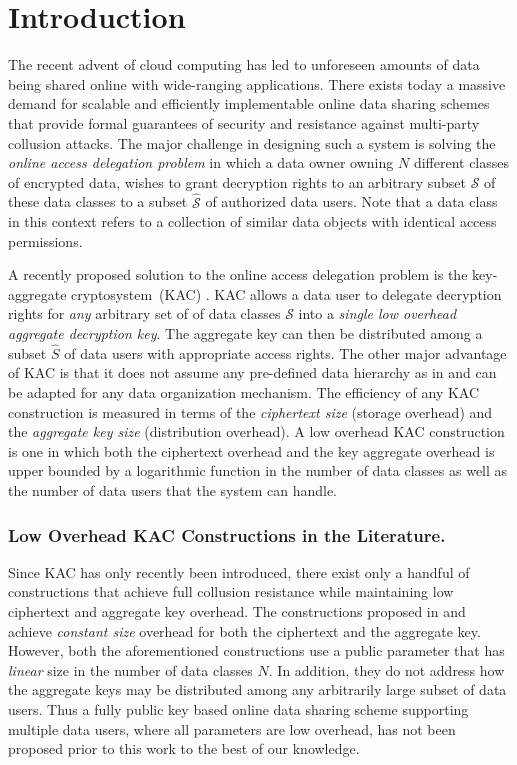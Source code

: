 \section{Introduction}
\label{sec:Introduction}

The recent advent of cloud computing has led to unforeseen amounts of data being shared online with wide-ranging applications. There exists today a massive demand for scalable and efficiently implementable online data sharing schemes that provide formal guarantees of security and resistance against multi-party collusion attacks. The major challenge in designing such a system is solving the \emph{online access delegation problem} \cite{drago2012inside,chu2014key} in which a data owner owning $N$ different classes of encrypted data, wishes to grant decryption rights to an arbitrary subset $\mathcal{S}$ of these data classes to a subset $\hat{\mathcal{S}}$ of authorized data users. Note that a data class in this context refers to a collection of similar data objects with identical access permissions.

A recently proposed solution to the online access delegation problem is the key-aggregate cryptosystem~(KAC) \cite{chu2014key,patranabis2015dynamic}. KAC allows a data user to delegate decryption rights for \emph{any} arbitrary set of of data classes $\mathcal{S}$ into a \emph{single low overhead aggregate decryption key}. The aggregate key can then be distributed among a subset $\hat{S}$ of data users with appropriate access rights. The other major advantage of KAC is that it does not assume any pre-defined data hierarchy as in \cite{boneh2005hierarchical,boyen2006anonymous} and can be adapted for any data organization mechanism. The efficiency of any KAC construction is measured in terms of the \emph{ciphertext size} (storage overhead) and the \emph{aggregate key size} (distribution overhead). A low overhead KAC construction is one in which both the ciphertext overhead and the key aggregate overhead is upper bounded by a logarithmic function in the number of data classes as well as the number of data users that the system can handle.

\subsubsection{Low Overhead KAC Constructions in the Literature.}  Since KAC has only recently been introduced, there exist only a handful of constructions that achieve full collusion resistance while maintaining low ciphertext and aggregate key overhead. The constructions proposed in \cite{chu2014key} and \cite{patranabis2015dynamic} achieve \emph{constant size} overhead for both the ciphertext and the aggregate key. However, both the aforementioned constructions use a public parameter that has \emph{linear} size in the number of data classes $N$. In addition, they do not address how the aggregate keys may be distributed among any arbitrarily large subset of data users. Thus a fully public key based online data sharing scheme supporting multiple data users, where all parameters are low overhead, has not been proposed prior to this work to the best of our knowledge. 


